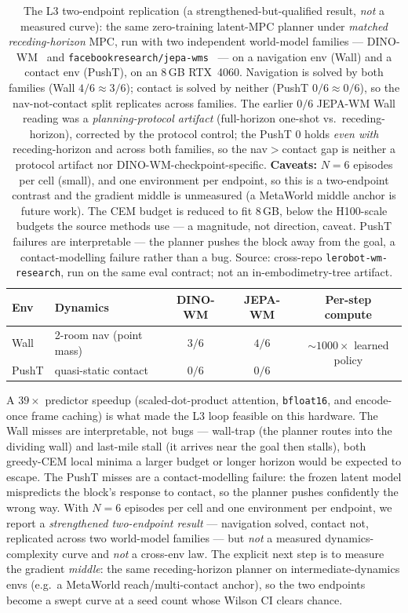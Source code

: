 \documentclass[10pt]{article}
\begin{document}
\begin{table}[t]
\centering
\small
\begin{tabular}{llccc}
\toprule
Env & Dynamics & DINO-WM & JEPA-WM & Per-step compute \\
\midrule
Wall  & 2-room nav (point mass) & $3/6$ & $4/6$ & \multirow{2}{*}{${\sim}1000\times$ learned policy} \\
PushT & quasi-static contact    & $0/6$ & $0/6$ & \\
\bottomrule
\end{tabular}
\caption{The L3 two-endpoint replication (a strengthened-but-qualified
result, \emph{not} a measured curve): the same zero-training latent-MPC
planner under \emph{matched receding-horizon} MPC, run with two independent
world-model families --- DINO-WM~\cite{zhou2024dinowm} and
\texttt{facebookresearch/jepa-wms}~\cite{assran2025vjepa2} --- on a
navigation env (Wall) and a contact env (PushT), on an 8\,GB RTX~4060.
Navigation is solved by both families (Wall $4/6 \approx 3/6$); contact is
solved by neither (PushT $0/6 \approx 0/6$), so the nav-not-contact split
replicates across families. The earlier $0/6$ JEPA-WM Wall reading was a
\emph{planning-protocol artifact} (full-horizon one-shot vs.\
receding-horizon), corrected by the protocol control; the PushT $0$ holds
\emph{even with} receding-horizon and across both families, so the
nav$>$contact gap is neither a protocol artifact nor
DINO-WM-checkpoint-specific. \textbf{Caveats:} $N{=}6$ episodes per cell
(small), and one environment per endpoint, so this is a two-endpoint
contrast and the gradient middle is unmeasured (a MetaWorld middle anchor is
future work). The CEM budget is reduced to fit 8\,GB, below the H100-scale
budgets the source methods use --- a magnitude, not direction, caveat.
PushT failures are interpretable --- the planner pushes the block away from
the goal, a contact-modelling failure rather than a bug. Source: cross-repo
\texttt{lerobot-wm-research}, run on the same eval contract; not an
in-embodimetry-tree artifact.}
\label{tab:l3}
\end{table}

A $39\times$ predictor speedup (scaled-dot-product attention,
\texttt{bfloat16}, and encode-once frame caching) is what made the L3
loop feasible on this hardware. The Wall misses are interpretable, not bugs
--- wall-trap (the planner routes into the dividing wall) and last-mile
stall (it arrives near the goal then stalls), both greedy-CEM local minima
a larger budget or longer horizon would be expected to escape. The PushT
misses are a contact-modelling failure: the frozen latent model mispredicts
the block's response to contact, so the planner pushes confidently the wrong
way. With $N{=}6$ episodes per cell and one environment per endpoint, we
report a \emph{strengthened two-endpoint result} --- navigation solved,
contact not, replicated across two world-model families --- but \emph{not}
a measured dynamics-complexity curve and \emph{not} a cross-env law. The
explicit next step is to measure the gradient \emph{middle}: the same
receding-horizon planner on intermediate-dynamics envs (e.g.\ a MetaWorld
reach/multi-contact anchor), so the two endpoints become a swept curve at a
seed count whose Wilson CI clears chance.
\end{document}
